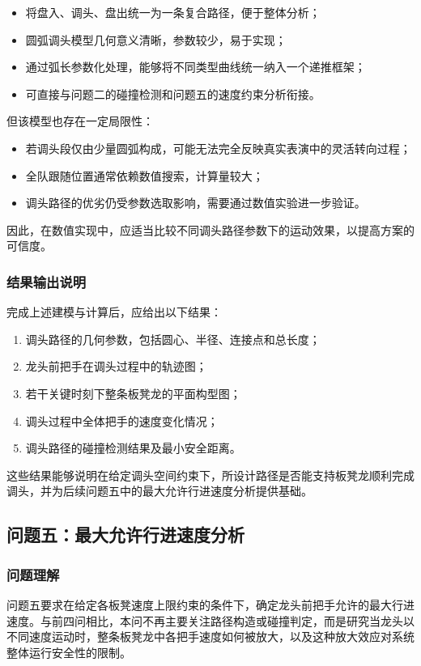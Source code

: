 \documentclass[12pt,a4paper]{ctexart}
\begin{document}
\begin{itemize}
    \item 将盘入、调头、盘出统一为一条复合路径，便于整体分析；
    \item 圆弧调头模型几何意义清晰，参数较少，易于实现；
    \item 通过弧长参数化处理，能够将不同类型曲线统一纳入一个递推框架；
    \item 可直接与问题二的碰撞检测和问题五的速度约束分析衔接。
\end{itemize}

但该模型也存在一定局限性：

\begin{itemize}
    \item 若调头段仅由少量圆弧构成，可能无法完全反映真实表演中的灵活转向过程；
    \item 全队跟随位置通常依赖数值搜索，计算量较大；
    \item 调头路径的优劣仍受参数选取影响，需要通过数值实验进一步验证。
\end{itemize}

因此，在数值实现中，应适当比较不同调头路径参数下的运动效果，以提高方案的可信度。

\subsubsection{结果输出说明}
完成上述建模与计算后，应给出以下结果：

\begin{enumerate}
    \item 调头路径的几何参数，包括圆心、半径、连接点和总长度；
    \item 龙头前把手在调头过程中的轨迹图；
    \item 若干关键时刻下整条板凳龙的平面构型图；
    \item 调头过程中全体把手的速度变化情况；
    \item 调头路径的碰撞检测结果及最小安全距离。
\end{enumerate}

\noindent 这些结果能够说明在给定调头空间约束下，所设计路径是否能支持板凳龙顺利完成调头，并为后续问题五中的最大允许行进速度分析提供基础。

\subsection{问题五：最大允许行进速度分析}

\subsubsection{问题理解}
问题五要求在给定各板凳速度上限约束的条件下，确定龙头前把手允许的最大行进速度。与前四问相比，本问不再主要关注路径构造或碰撞判定，而是研究当龙头以不同速度运动时，整条板凳龙中各把手速度如何被放大，以及这种放大效应对系统整体运行安全性的限制。
\end{document}
